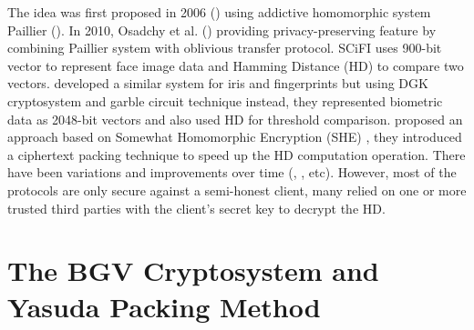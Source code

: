 The idea was first proposed in 2006 (\cite{schoenmakers2006efficient}) using addictive homomorphic system Paillier
(\cite{paillier1999public}). In 2010, Osadchy et al. (\cite{osadchy2010scifi}) providing privacy-preserving feature by
combining Paillier system with oblivious transfer protocol. SCiFI uses 900-bit vector to represent face image data and
Hamming Distance (HD) to compare two vectors. \cite{blanton2011secure} developed a similar system for iris and
fingerprints but using DGK cryptosystem \cite{damgard2008homomorphic} and garble circuit technique instead, they
represented biometric data as 2048-bit vectors and also used HD for threshold comparison. \cite{yasuda2014practical}
proposed an approach based on Somewhat Homomorphic Encryption (SHE) \cite{brakerski2011fully}, they introduced a
ciphertext packing technique to speed up the HD computation operation. There have been variations and improvements over
time (\cite{shahandashti2012private}, \cite{mandal2015comprehensive}, etc). However, most of the protocols are only
secure against a semi-honest client, many relied on one or more trusted third parties with the client's secret key to
decrypt the HD.



\section{The BGV Cryptosystem and Yasuda Packing Method}
\label{sec:firstProcBGV}

